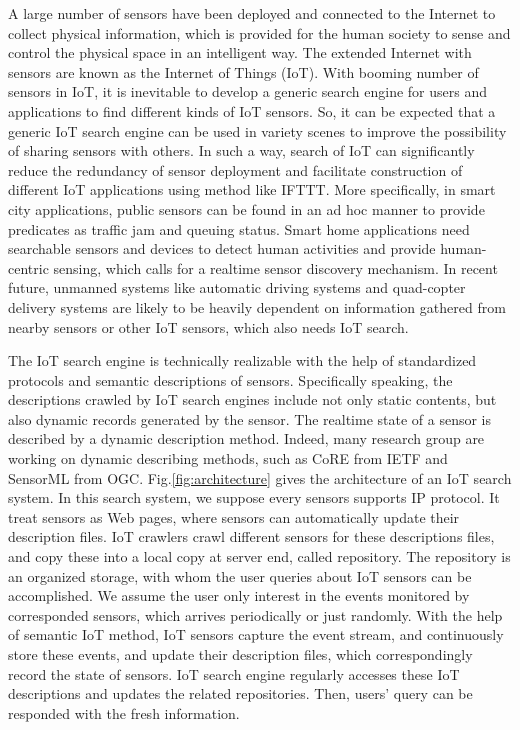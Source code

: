 \documentclass[conference]{IEEEtran}
\begin{document}
A large number of sensors have been deployed and connected to the Internet to collect physical information, which is provided for the human society to sense and control the physical space in an intelligent way. 
The extended Internet with sensors are known as the Internet of Things (IoT). 
With booming number of sensors in IoT, it is inevitable to develop a generic search engine for users and applications to find different kinds of IoT sensors. 
So, it can be expected that a generic IoT search engine can be used in variety scenes to improve the possibility of sharing sensors with others.
In such a way, search of IoT can significantly reduce the redundancy of sensor deployment and facilitate construction of different IoT applications using method like IFTTT\cite{ifttt}.
More specifically, in smart city applications, public sensors can be found in an ad hoc manner to provide predicates as traffic jam and queuing status. 
Smart home applications need searchable sensors and devices to detect human activities and provide human-centric sensing, which calls for a realtime sensor discovery mechanism. In recent future, unmanned systems like automatic driving systems and quad-copter delivery systems are likely to be heavily dependent on information gathered from nearby sensors or other IoT sensors, which also needs IoT search. 

The IoT search engine is technically realizable with the help of standardized protocols and semantic descriptions of sensors\cite{Pfisterer2011}. 
Specifically speaking, the descriptions crawled by IoT search engines include not only static contents, but also dynamic records generated by the sensor. The realtime state of a sensor is described by a dynamic description method.
Indeed, many research group are working on dynamic describing methods, such as CoRE\cite{CoREWorkingGroup2012} from IETF and SensorML\cite{botts2007opengis} from OGC. 
Fig.\ref{fig:architecture} gives the architecture of an IoT search system.
In this search system, we suppose every sensors supports IP protocol.
It treat sensors as Web pages, where sensors can automatically update their description files.
IoT crawlers crawl different sensors for these descriptions files, and copy these into a local copy at server end, called repository. The repository is an organized storage, with whom the user queries about IoT sensors can be accomplished.
We assume the user only interest in the events monitored by corresponded sensors, which arrives periodically or just randomly. 
With the help of semantic IoT method, IoT sensors capture the event stream, and continuously store these events, and update their description files, which correspondingly record the state of sensors. 
IoT search engine regularly accesses these IoT descriptions and updates the related repositories. Then, users' query can be responded with the fresh information.
\end{document}
